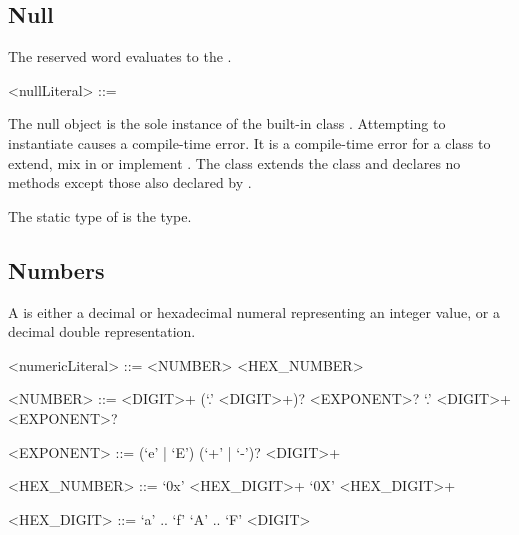 \documentclass[makeidx]{article}
\begin{document}
{


\subsection{Null}

\LMHash{}%
The reserved word \NULL{} evaluates to the .

\begin{grammar}
<nullLiteral> ::= \NULL{}
\end{grammar}

\LMHash{}%
The null object is the sole instance of the built-in class .
Attempting to instantiate  causes a compile-time error.
It is a compile-time error for a class to extend, mix in or implement
.
The  class extends the  class
and declares no methods except those also declared by .


\LMHash{}%
The static type of \NULL{} is the  type.


\subsection{Numbers}

\LMHash{}%
A 
is either a decimal or hexadecimal numeral representing an integer value,
or a decimal double representation.

\begin{grammar}
<numericLiteral> ::= <NUMBER>
  \alt <HEX\_NUMBER>

<NUMBER> ::= <DIGIT>+ (`.' <DIGIT>+)? <EXPONENT>?
  \alt `.' <DIGIT>+ <EXPONENT>?

<EXPONENT> ::= (`e' | `E') (`+' | `-')? <DIGIT>+

<HEX\_NUMBER> ::= `0x' <HEX\_DIGIT>+
  \alt `0X' <HEX\_DIGIT>+

<HEX\_DIGIT> ::= `a' .. `f'
  \alt `A' .. `F'
  \alt <DIGIT>
\end{grammar}

}
\end{document}
